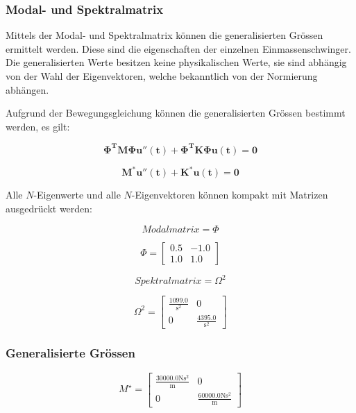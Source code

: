 \documentclass[
  letterpaper,
  DIV=11]{scrreprt}
\begin{document}
\hypertarget{modal--und-spektralmatrix-1}{%
\subsubsection{Modal- und
Spektralmatrix}\label{modal--und-spektralmatrix-1}}

Mittels der Modal- und Spektralmatrix können die generalisierten Grössen
ermittelt werden. Diese sind die eigenschaften der einzelnen
Einmassenschwinger. Die generalisierten Werte besitzen keine
physikalischen Werte, sie sind abhängig von der Wahl der Eigenvektoren,
welche bekanntlich von der Normierung abhängen.

Aufgrund der Bewegungsgleichung können die generalisierten Grössen
bestimmt werden, es gilt:

\[\mathbf{\Phi^T M \Phi u''(t) + \Phi^T K \Phi u(t) = 0}\]

\[\mathbf{M^*u''(t) + K^* u(t) = 0}\]

Alle \(N\)-Eigenwerte und alle \(N\)-Eigenvektoren können kompakt mit
Matrizen ausgedrückt werden:

\begin{equation*}Modalmatrix = \Phi\end{equation*}

\begin{equation*}\Phi = \left[\begin{matrix}0.5 & -1.0\\1.0 & 1.0\end{matrix}\right]\end{equation*}

\begin{equation*}Spektralmatrix = \Omega^{2}\end{equation*}

\begin{equation*}\Omega^{2} = \left[\begin{matrix}\frac{1099.0}{\text{s}^{2}} & 0\\0 & \frac{4395.0}{\text{s}^{2}}\end{matrix}\right]\end{equation*}

\hypertarget{generalisierte-gruxf6ssen-1}{%
\subsubsection{Generalisierte
Grössen}\label{generalisierte-gruxf6ssen-1}}

\begin{equation*}M^{\star} = \left[\begin{matrix}\frac{30000.0 \text{N} \text{s}^{2}}{\text{m}} & 0\\0 & \frac{60000.0 \text{N} \text{s}^{2}}{\text{m}}\end{matrix}\right]\end{equation*}
\end{document}
